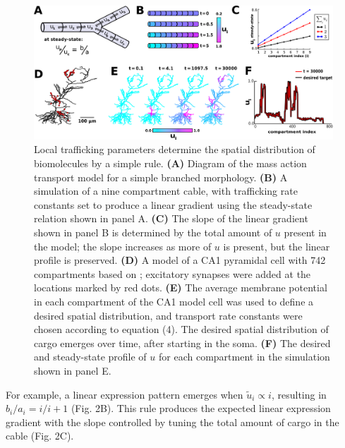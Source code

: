 \documentclass[10pt]{wlpeerj}
\begin{document}
\begin{figure}[!tb]
\begin{center}
\includegraphics[width=0.9\columnwidth]{01_mass_action.png}
\caption{Local trafficking parameters determine the spatial distribution of biomolecules by a simple rule.
\textbf{(A)} Diagram of the mass action transport model for a simple branched morphology.
\textbf{(B)} A simulation of a nine compartment cable, with trafficking rate constants set to produce a linear gradient using the steady-state relation shown in panel A.
\textbf{(C)} The slope of the linear gradient shown in panel B is determined by the total amount of $u$ present in the model; the slope increases as more of $u$ is present, but the linear profile is preserved.
\textbf{(D)} A model of a CA1 pyramidal cell with 742 compartments based on \cite{Migliore_2012}; excitatory synapses were added at the locations marked by red dots. 
\textbf{(E)} The average membrane potential in each compartment of the CA1 model cell was used to define a desired spatial distribution, and transport rate constants were chosen according to equation (4). The desired spatial distribution of cargo emerges over time, after starting in the soma.
\textbf{(F)} The desired and steady-state profile of $u$ for each compartment in the simulation shown in panel E.
}
\end{center}
\end{figure}

For example, a linear expression pattern emerges when $\tilde{u}_i \propto i$, resulting in $b_i / a_i = i / i + 1$ (Fig. 2B).
This rule produces the expected linear expression gradient with the slope controlled by tuning the total amount of cargo in the cable (Fig. 2C).
\end{document}
